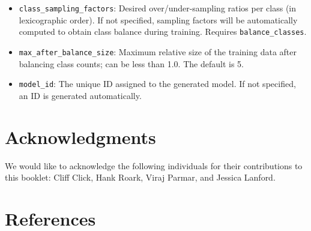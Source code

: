 \begin{itemize}
\item {\texttt{class\_sampling\_factors}}: Desired over/under-sampling ratios per class (in lexicographic order). If not specified, sampling factors will be automatically computed to obtain class balance during training. Requires \texttt{balance\_classes}.
\item {\texttt{max\_after\_balance\_size}}: Maximum relative size of the training data after balancing class counts; can be less than 1.0.  The default is 5.
\item \texttt{model\_id}: The unique ID assigned to the generated model. If not specified, an ID is generated automatically.
\end{itemize}

\section{Acknowledgments}
We would like to acknowledge the following individuals for their contributions to this booklet: Cliff Click, Hank Roark, Viraj Parmar, and Jessica Lanford.

\newpage
\section{References}

















